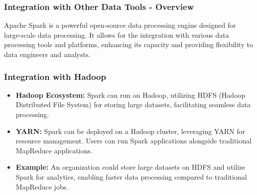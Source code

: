 \documentclass[aspectratio=169]{beamer}
\begin{document}
\begin{frame}[fragile]
    \frametitle{Integration with Other Data Tools - Overview}
    Apache Spark is a powerful open-source data processing engine designed for large-scale data processing. It allows for the integration with various data processing tools and platforms, enhancing its capacity and providing flexibility to data engineers and analysts.
\end{frame}

\begin{frame}[fragile]
    \frametitle{Integration with Hadoop}
    \begin{itemize}
        \item \textbf{Hadoop Ecosystem:} 
        Spark can run on Hadoop, utilizing HDFS (Hadoop Distributed File System) for storing large datasets, facilitating seamless data processing.
        
        \item \textbf{YARN:} 
        Spark can be deployed on a Hadoop cluster, leveraging YARN for resource management. Users can run Spark applications alongside traditional MapReduce applications.
        
        \item \textbf{Example:} 
        An organization could store large datasets on HDFS and utilize Spark for analytics, enabling faster data processing compared to traditional MapReduce jobs.
    \end{itemize}
\end{frame}
\end{document}

